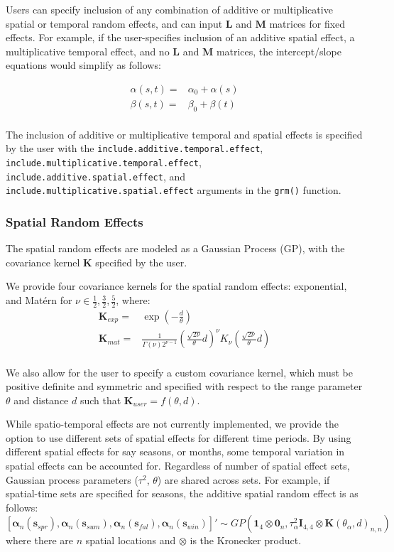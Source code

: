 \documentclass[12pt]{article}
\newcommand{\bs}{\boldsymbol}
\newcommand{\bl}{\mathbf}
\begin{document}
Users can specify inclusion of any combination of additive or multiplicative spatial or temporal random effects, and can input $\bl{L}$ and $\bl{M}$ matrices for fixed effects.
For example, if the user-specifies inclusion of an additive spatial effect, a multiplicative temporal effect, and no $\bl{L}$ and $\bl{M}$ matrices, the intercept/slope equations would simplify as follows:

\begin{align*}
    \alpha(s, t) =& \alpha_0 + \alpha(s)\\
    \beta(s, t) =& \beta_0 + \beta(t) \\
\end{align*} 

The inclusion of additive or multiplicative temporal and spatial effects is specified by the user with the \texttt{include.additive.temporal.effect}, \\ \texttt{include.multiplicative.temporal.effect}, \texttt{include.additive.spatial.effect}, and \texttt{include.multiplicative.spatial.effect} arguments in the \texttt{grm()} function.

\subsubsection*{Spatial Random Effects}

The spatial random effects are modeled as a Gaussian Process (GP), with the covariance kernel $\bl{K}$ specified by the user. 

We provide four covariance kernels for the spatial random effects: exponential, and Mat\'{e}rn for $\nu \in {\frac{1}{2}, \frac{3}{2}, \frac{5}{2}}$, where:
\begin{align*}
    \bs{K}_{exp} =& \exp \left( - \frac{d}{\theta} \right) \\
    \bs{K}_{mat} =& \frac{1}{\Gamma(\nu) 2^{\nu - 1}} \left( \frac{\sqrt{2 \nu}}{\theta} d \right)^{\nu} K_{\nu} \left( \frac{\sqrt{2 \nu}}{\theta} d \right) \\
\end{align*} 

We also allow for the user to specify a custom covariance kernel, which must be positive definite and symmetric and specified with respect to the range parameter $\theta$ and distance $d$ such that $\bl{K}_{user} = f(\theta, d)$. 

While spatio-temporal effects are not currently implemented, we provide the option to use different sets of spatial effects for different time periods. 
By using different spatial effects for say seasons, or months, some temporal variation in spatial effects can be accounted for.
Regardless of number of spatial effect sets, Gaussian process parameters ($\tau^2$, $\theta$) are shared across sets. 
For example, if spatial-time sets are specified for seasons, the additive spatial random effect is as follows:
\[
    [\bs{\alpha}_n(\bl{s}_{spr}), 
        \bs{\alpha}_n(\bl{s}_{sum}),
        \bs{\alpha}_n(\bl{s}_{fal}),
        \bs{\alpha}_n(\bl{s}_{win})]' \sim GP(\bl{1}_4 \otimes \bl{0}_n, \tau_{\alpha}^2 \bl{I}_{4,4} \otimes \bl{K}(\theta_{\alpha}, d)_{n,n})
\]
where there are $n$ spatial locations and $\otimes$ is the Kronecker product.
\end{document}

